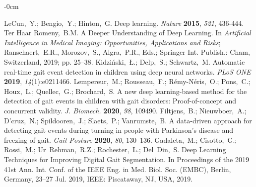 \documentclass[sensors,article,submit,pdftex,moreauthors]{Definitions/mdpi}
\begin{document}
\begin{adjustwidth}{-\extralength}{0cm}
\begin{thebibliography}{999}
	LeCun,~Y.; Bengio,~Y.; Hinton,~G. Deep learning. {\em Nature} {\bf 2015}, {\em 521}, 436-444.
	Ter Haar Romeny,~B.M. A Deeper Understanding of Deep Learning. In {\em Artificial Intelligence in Medical Imaging: Opportunities, Applications and Risks}; Ranschaert,~E.R., Morozov,~S., Algra,~P.R., Eds.; Springer Int. Publish.: Cham, Switzerland, 2019; pp. 25--38.	
	Kidzi\'{n}ski,~{\L}.; Delp,~S.; Schwartz,~M. Automatic real-time gait event detection in children using deep neural networks. {\em PLoS ONE} {\bf 2019}, {\em 14}(1):e0211466.
	Lempereur,~M.; Rousseau,~F.; R\'{e}my-N\'{e}ris,~O.; Pons,~C.; Houx,~L.; Quellec,~G.; Brochard,~S. A new deep learning-based method for the detection of gait events in children with gait disorders: Proof-of-concept and concurrent validity. {\em J. Biomech.} {\bf 2020}, {\em 98}, 109490.
	Filtjens,~B.; Nieuwboer,~A.; D'cruz,~N.; Spildooren,~J.; Slaets,~P.; Vanrumste,~B. A data-driven approach for detecting gait events during turning in people with Parkinson's disease and freezing of gait. {\em Gait Posture} {\bf 2020}, {\em 80}, 130--136.
	Gadaleta,~M.; Cisotto,~G.; Rossi,~M.; Ur~Rehman,~R.Z.; Rochester,~L.; Del~Din,~S. Deep Learning Techniques for Improving Digital Gait Segmentation. In Proceedings of the 2019 41st Ann. Int. Conf. of the IEEE Eng. in Med. Biol. Soc. (EMBC), Berlin, Germany, 23--27 Jul. 2019, IEEE: Piscataway, NJ, USA, 2019.
	

\end{thebibliography}
\end{adjustwidth}
\end{document}

